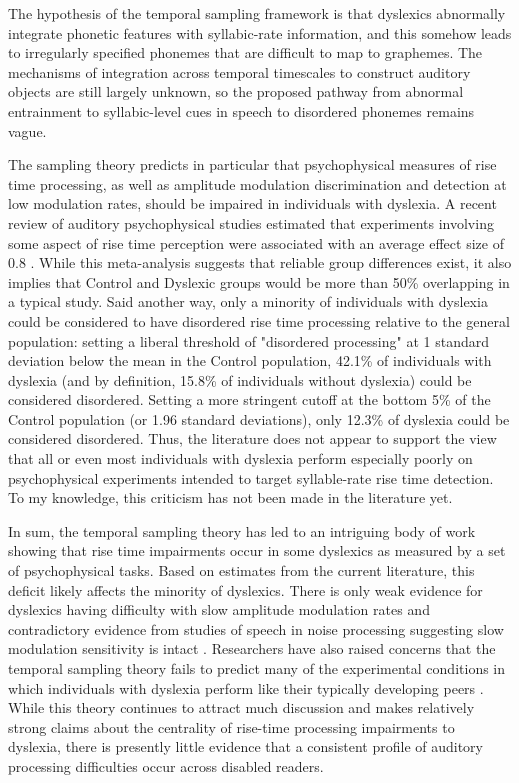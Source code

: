 \documentclass[../uwthesis.tex]{subfiles}
\begin{document}
The hypothesis of the temporal sampling framework is that dyslexics abnormally integrate phonetic features with syllabic-rate information, and this somehow leads to irregularly
specified phonemes that are difficult to map to graphemes. The mechanisms of integration across temporal timescales to construct auditory objects are still largely unknown, so the proposed pathway from abnormal entrainment to syllabic-level cues in speech to disordered phonemes remains vague.

The sampling theory predicts in particular that psychophysical measures of rise time processing, as well as amplitude modulation discrimination and detection at low modulation rates, should be impaired in individuals with dyslexia. A recent review of auditory psychophysical studies estimated that experiments involving some aspect of rise time perception were associated with an average effect size of 0.8 \citep{Hamalainen2013}. While this meta-analysis suggests that reliable group differences exist, it also implies that Control and Dyslexic groups would be more than 50\% overlapping in a typical study. Said another way, only a minority of individuals with dyslexia could be considered to have disordered rise time processing relative to the general population: setting a liberal threshold of "disordered processing" at 1 standard deviation below the mean in the Control population, 42.1\% of individuals with dyslexia (and by definition, 15.8\% of individuals without dyslexia) could be considered disordered. Setting a more stringent cutoff at the bottom 5\% of the Control population (or 1.96 standard deviations), only 12.3\% of dyslexia could be considered disordered. Thus, the literature does not appear to support the view that all or even most individuals with dyslexia perform especially poorly on psychophysical experiments intended to target syllable-rate rise time detection. To my knowledge, this criticism has not been made in the literature yet. 

In sum, the temporal sampling theory has led to an intriguing body of work showing
that rise time impairments occur in some dyslexics as measured by a set of psychophysical tasks. Based on estimates from the current literature, this deficit likely affects the minority of dyslexics. There is only weak evidence for dyslexics having difficulty with slow amplitude modulation rates \citep{Amitay2002,Lorenzi2000,Stuart2006,Witton2002} and contradictory evidence from studies of speech in noise processing suggesting slow modulation sensitivity is intact \citep{Ziegler2009,Dole2012,Calcus2016}. Researchers have also raised concerns that the temporal sampling theory fails to predict many of the experimental conditions in which individuals with dyslexia perform like their typically developing peers \citep{Ramus2012}. While this theory continues to attract much discussion and makes relatively strong claims about the centrality of rise-time processing impairments to dyslexia, there is presently little evidence that a consistent profile of auditory processing difficulties occur across disabled readers. 
\end{document}
